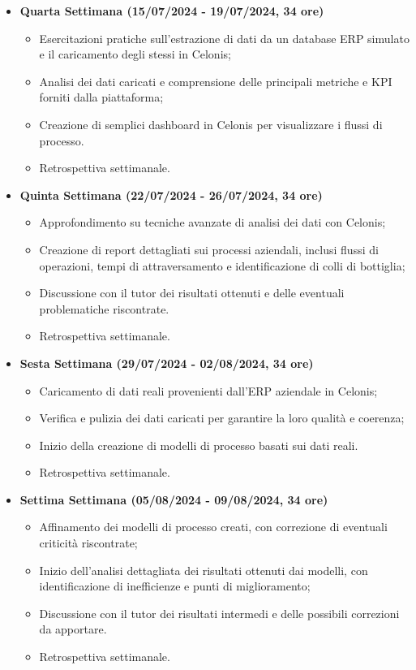 {\begin{itemize}
    \item \textbf{Quarta Settimana (15/07/2024 - 19/07/2024, 34 ore)}
    \begin{itemize}
        \item Esercitazioni pratiche sull'estrazione di dati da un database ERP simulato e il caricamento degli stessi in Celonis;
        \item Analisi dei dati caricati e comprensione delle principali metriche e KPI forniti dalla piattaforma;
        \item Creazione di semplici dashboard in Celonis per visualizzare i flussi di processo.
        \item Retrospettiva settimanale.
    \end{itemize}

    \item \textbf{Quinta Settimana (22/07/2024 - 26/07/2024, 34 ore)}
    \begin{itemize}
        \item Approfondimento su tecniche avanzate di analisi dei dati con Celonis;
        \item Creazione di report dettagliati sui processi aziendali, inclusi flussi di operazioni, tempi di attraversamento e identificazione di colli di bottiglia;
        \item Discussione con il tutor dei risultati ottenuti e delle eventuali problematiche riscontrate.
        \item Retrospettiva settimanale.
    \end{itemize}
\newpage

    \item \textbf{Sesta Settimana (29/07/2024 - 02/08/2024, 34 ore)}
    \begin{itemize}
        \item Caricamento di dati reali provenienti dall'ERP aziendale in Celonis;
        \item Verifica e pulizia dei dati caricati per garantire la loro qualità e coerenza;
        \item Inizio della creazione di modelli di processo basati sui dati reali.
        \item Retrospettiva settimanale.
    \end{itemize}


    \item \textbf{Settima Settimana (05/08/2024 - 09/08/2024, 34 ore)}
    \begin{itemize}
        \item Affinamento dei modelli di processo creati, con correzione di eventuali criticità riscontrate;
        \item Inizio dell'analisi dettagliata dei risultati ottenuti dai modelli, con identificazione di inefficienze e punti di miglioramento;
        \item Discussione con il tutor dei risultati intermedi e delle possibili correzioni da apportare.
        \item Retrospettiva settimanale.
    \end{itemize}


\end{itemize}}
